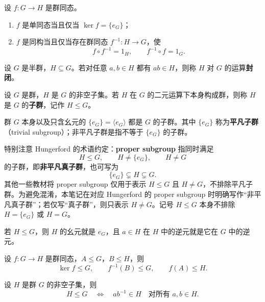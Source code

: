 \begin{theorem}\label{thm:mono-kernel}
设 $f:G\to H$ 是群同态。
\begin{enumerate}[label=(\arabic*)]
  \item $f$ 是单同态当且仅当 $\ker f=\{e_G\}$；
  \item $f$ 是同构当且仅当存在群同态 $f^{-1}:H\to G$，使
  \[
    f\circ f^{-1}=1_H,\qquad f^{-1}\circ f=1_G.
  \]
\end{enumerate}
\end{theorem}

\begin{definition}[对运算封闭]\label{def:closed-under-operation}
设 $G$ 是半群，$H\subseteq G$。若对任意 $a,b\in H$ 都有 $ab\in H$，则称 $H$ 对 $G$ 的运算\textbf{封闭}。
\end{definition}

\begin{definition}[子群]\label{def:subgroup}
设 $G$ 是群，$H$ 是 $G$ 的非空子集。若 $H$ 在 $G$ 的二元运算下本身构成群，则称 $H$ 是 $G$ 的\textbf{子群}，记作 $H\leq G$。
\end{definition}

\begin{purplenote}
群 $G$ 本身以及只含幺元的 $\{e_G\}=\langle e_G\rangle$ 都是 $G$ 的子群。其中 $\{e_G\}$ 称为\textbf{平凡子群}（trivial subgroup）；非平凡子群是指不等于 $\{e_G\}$ 的子群。

特别注意 Hungerford 的术语约定：\textbf{proper subgroup} 指同时满足
\[
  H\leq G,\qquad H\neq\{e_G\},\qquad H\neq G
\]
的子群，即\textbf{非平凡真子群}，也可写为
\[
  \{e_G\}\subsetneq H\subsetneq G.
\]
其他一些教材将 proper subgroup 仅用于表示 $H\leq G$ 且 $H\neq G$，不排除平凡子群。为避免混淆，本笔记在对应 Hungerford 的 proper subgroup 时明确写作“非平凡真子群”；若仅写“真子群”，则只表示 $H\neq G$。记号 $H\leq G$ 本身不排除 $H=\{e_G\}$ 或 $H=G$。

若 $H\leq G$，则 $H$ 的幺元就是 $e_G$，且 $a\in H$ 在 $H$ 中的逆元就是它在 $G$ 中的逆元。
\end{purplenote}

\begin{theorem}\label{thm:image-preimage-subgroups}
设 $f:G\to H$ 是群同态，$A\leq G$，$B\leq H$，则
\[
  \ker f\leq G,\qquad f^{-1}(B)\leq G,\qquad f(A)\leq H.
\]
\end{theorem}

\begin{theorem}[子群判别法]\label{thm:subgroup-test}
设 $H$ 是群 $G$ 的非空子集，则
\[
  H\leq G
  \quad\Longleftrightarrow\quad
  ab^{-1}\in H\quad\text{对所有 }a,b\in H.
\]
\end{theorem}


